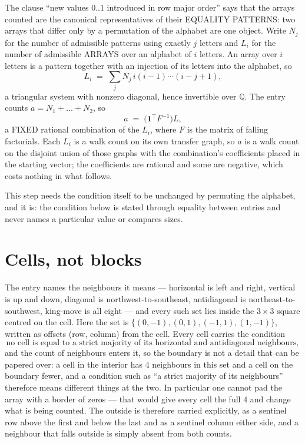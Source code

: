 \documentclass[11pt,a4paper]{article}
\theoremstyle{plain}
\theoremstyle{definition}
\begin{document}
The clause ``new values $0..1$ introduced in row major order'' says that the arrays
counted are the canonical representatives of their EQUALITY PATTERNS: two arrays that differ
only by a permutation of the alphabet are one object. Write $N_j$ for the number of admissible
patterns using exactly $j$ letters and $L_i$ for the number of admissible ARRAYS over an
alphabet of $i$ letters. An array over $i$ letters is a pattern together with an injection of
its letters into the alphabet, so
\[
L_i\;=\;\sum_{j}N_j\,i(i-1)\cdots(i-j+1),
\]
a triangular system with nonzero diagonal, hence invertible over $\mathbb{Q}$. The entry
counts $a=N_1+\dots+N_{2}$, so
\[
a\;=\;\bigl(\mathbf{1}^{\!\top}F^{-1}\bigr)L ,
\]
a FIXED rational combination of the $L_i$, where $F$ is the matrix of falling factorials.
Each $L_i$ is a walk count on its own transfer graph, so $a$ is a walk count on the disjoint
union of those graphs with the combination's coefficients placed in the starting vector; the
coefficients are rational and some are negative, which costs nothing in what follows.

This step needs the condition itself to be unchanged by permuting the alphabet, and it is:
the condition below is stated through equality between entries and never names a particular
value or compares sizes.

\section{Cells, not blocks}

The entry names the neighbours it means --- horizontal is left and right, vertical is up and
down, diagonal is northwest-to-southeast, antidiagonal is northeast-to-southwest, king-move is
all eight --- and every such set lies inside the $3\times3$ square centred on the cell. Here
the set is $\{(0,-1), (0,1), (-1,1), (1,-1)\}$, written as offsets (row, column) from the cell. Every cell carries
the condition
\[
\text{no cell is equal to a strict majority of its horizontal and antidiagonal neighbours},
\]
and the count of neighbours enters it, so the boundary is not a detail that can be papered
over: a cell in the interior has $4$ neighbours in this set and a cell on the boundary
fewer, and a condition such as ``a strict majority of its neighbours'' therefore means
different things at the two. In particular one cannot pad the array with a border of zeros ---
that would give every cell the full $4$ and change what is being counted. The outside is
therefore carried
explicitly, as a sentinel row above the first and below the last and as a sentinel column
either side, and a neighbour that falls outside is simply absent from both counts.
\end{document}
